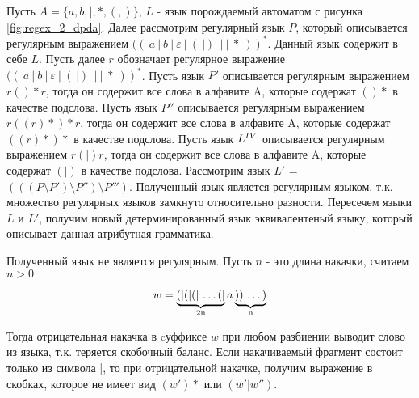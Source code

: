 \documentclass[a4paper, 14pt]{article}
\begin{document}
Пусть $A = \{a, b, |, *, (, )\}$, $L$ - язык порождаемый автоматом с рисунка \ref{fig:regex_2_dpda}. Далее рассмотрим регулярный язык $P$, который описывается регулярным выражением $((\ a \ | \ b \ | \ \varepsilon \ | \ ( \ | \ ) \ | \ \textbf{|} \ | \ * \ ))^*$. Данный язык содержит в себе $L$. Пусть далее $r$ обозначает регулярное выражение $((\ a \ | \ b \ | \ \varepsilon \ | \ ( \ | \ ) \ | \ \textbf{|} \ | \ * \ ))^*$.  Пусть язык $P'$ описывается регулярным выражением $r(){*}r$, тогда он содержит все слова в алфавите A, которые содержат $(){*}$ в качестве подслова. Пусть язык $P''$ описывается регулярным выражением $r((r){*}){*}r$, тогда он содержит все слова в алфавите A, которые содержат $((r){*}){*}$ в качестве подслова. Пусть язык $L^{\MakeUppercase{\romannumeral 4}}$ описывается регулярным выражением $r(|)r$, тогда он содержит все слова в алфавите A, которые содержат $(|)$ в качестве подслова. Рассмотрим язык $L'$ = $(((P \setminus P') \setminus P'') \setminus P''')$. Полученный язык является регулярным языком, т.к. множество регулярных языков замкнуто относительно разности. Пересечем языки $L$ и $L'$, получим новый детерминированный язык эквивалентеный языку, который описывает данная атрибутная грамматика.
  
Полученный язык не является регулярным. Пусть $n$ - это длина накачки, считаем $n > 0$

$$
  w =  \underbrace{\text{(|(|(| \dots(|}}_{\text{2n}} a \underbrace{\text{)) \dots)}}_{\text{n}}
$$

Тогда отрицательная накачка в cуффиксе $w$ при любом разбиении выводит слово из языка, т.к. теряется скобочный баланс. Если накачиваемый фрагмент состоит только из символа |, то при отрицательной накачке, получим выражение в скобках, которое не имеет вид $(w')*$ или $(w'|w'')$.
\end{document}
